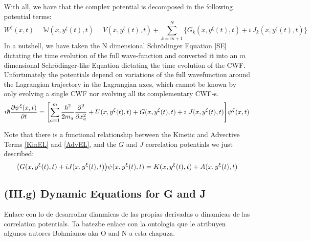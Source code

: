 \documentclass[11pt, a4paper]{article} %
\newcommand{\W}{\mathbb{W}}
\begin{document}
With all, we have that the complex potential is decomposed in the following potential terms:
$$
W^\xi(x,t)=\W(x, y^\xi(t),t)= V(x, y^\xi(t),t) + \sum_{k=m+1}^N\Big\{ G_k(x, y^\xi(t),t)+i\ J_k(x, y^\xi(t),t)\Big\}
$$
In a nutshell, we have taken the N dimensional Schrödinger Equation \eqref{SE} dictating the time evolution of the full wave-function and converted it into an $m$ dimensional Schrödinger-like Equation dictating the time evolution of the CWF. Unfortunately the potentials depend on variations of the full wavefunction around the Lagrangian trajectory in the Lagrangian axes, which cannot be known by only evolving a single CWF nor evolving all its complementary CWF-s.
\begin{equation}\label{SE.GJ}
i \hbar \pdv{\psi^\xi (x,t)}{t} = \qty[\sum_{a=1}^m\frac{\hbar^2}{2m_a} \pdv[2]{}{x_a} +  U(x, y^\xi(t),t) + G(x, y^\xi(t),t)+i\ J(x, y^\xi(t),t)] \psi^\xi (x,t)
\end{equation}

Note that there is a functional relationship between the Kinetic and Advective Terms \eqref{KinEL} and \eqref{AdvEL}, and the $G$ and $J$ correlation potentials we just described: 
\begin{equation}
\qty(G(x, y^\xi(t),t)+iJ(x, y^\xi(t),t))\psi(x, y^\xi(t),t)=K(x, y^\xi(t),t)+A(x, y^\xi(t),t)
\end{equation}

\subsection*{(III.g) Dynamic Equations for G and J}
Enlace con lo de desarrollar dianmicas de las propias derivadas o dinamicas de las correlation potentials. Ta batezbe enlace con la ontologia que le atribuyen algunos autores Bohmianos aka O and N a esta chapuza.
\end{document}

